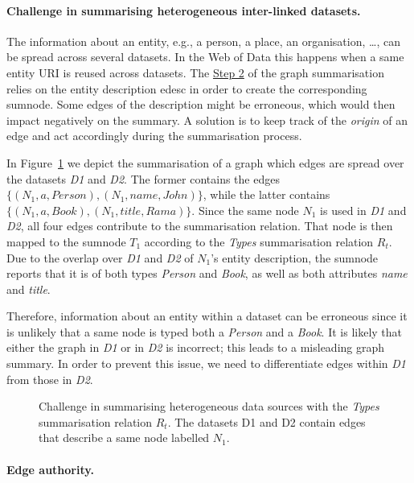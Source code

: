 \paragraph{Challenge in summarising heterogeneous inter-linked datasets.}

The information about an entity, e.g., a person, a place, an organisation, \ldots, can be spread across several datasets. In the Web of Data this happens when a same entity URI is reused across datasets. The \hyperref[step-hn]{Step 2} of the graph summarisation relies on the entity description \gls{edesc} in order to create the corresponding sumnode. Some edges of the description might be erroneous, which would then impact negatively on the summary. A solution is to keep track of the \emph{origin} of an edge and act accordingly during the summarisation process.

In Figure~\ref{fig:sum-issue} we depict the summarisation of a graph which edges are spread over the datasets \emph{D1} and \emph{D2}. The former contains the edges $\{ (N_1, a, Person), (N_1, name, John) \}$, while the latter contains $\{ (N_1, a, Book), (N_1, title, Rama) \}$. Since the same node $N_1$ is used in \emph{D1} and \emph{D2}, all four edges contribute to the summarisation relation. That node is then mapped to the sumnode $T_1$ according to the \emph{Types} summarisation relation $R_t$.
Due to the overlap over \emph{D1} and \emph{D2} of $N_1$'s entity description, the sumnode reports that it is of both types \emph{Person} and \emph{Book}, as well as both attributes \emph{name} and \emph{title}.

Therefore, information about an entity within a dataset can be erroneous since it is unlikely that a same node is typed both a \emph{Person} and a \emph{Book}. It is likely that either the graph in \emph{D1} or in \emph{D2} is incorrect; this leads to a misleading graph summary.
In order to prevent this issue, we need to differentiate edges within \emph{D1} from those in \emph{D2}.

\begin{figure}
	\centering
	\resizebox{.8\textwidth}{!}{
		
	}
	\caption{Challenge in summarising heterogeneous data sources with the \emph{Types} summarisation relation $R_t$. The datasets D1 and D2 contain edges that describe a same node labelled $N_1$.}
	\label{fig:sum-issue}
\end{figure}

\paragraph{Edge authority.}

